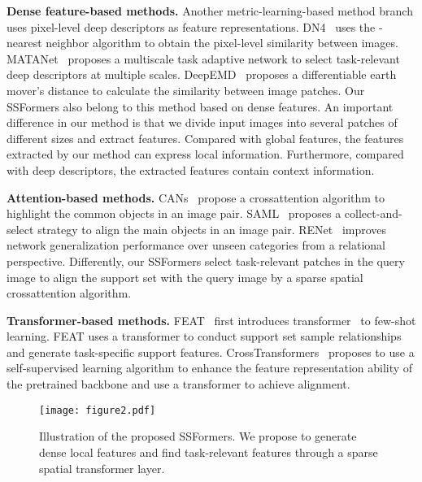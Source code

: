 \documentclass{SCIS2019}
\begin{document}
\textbf{Dense feature-based methods.} Another metric-learning-based method branch uses pixel-level deep descriptors as feature representations. DN4~\cite{9} uses the -nearest neighbor algorithm to obtain the pixel-level similarity between images. MATANet~\cite{12} proposes a multiscale task adaptive network to select task-relevant deep descriptors at multiple scales. DeepEMD~\cite{13} proposes a differentiable earth mover's distance to calculate the similarity between image patches. Our SSFormers also belong to this method based on dense features. An important difference in our method is that we divide input images into several patches of different sizes and extract features. Compared with global features, the features extracted by our method can express local information. Furthermore, compared with deep descriptors, the extracted features contain context information.

\textbf{Attention-based methods.} CANs~\cite{14} propose a crossattention algorithm to highlight the common objects in an image pair. SAML~\cite{15} proposes a collect-and-select strategy to align the main objects in an image pair. RENet~\cite{10} improves network generalization performance over unseen categories from a relational perspective. Differently, our SSFormers select task-relevant patches in the query image to align the support set with the query image by a sparse spatial crossattention algorithm.

\textbf{Transformer-based methods.} FEAT~\cite{19} first introduces transformer~\cite{20} to few-shot learning. FEAT uses a transformer to conduct support set sample relationships and generate task-specific support features. CrossTransformers~\cite{21} proposes to use a self-supervised learning algorithm to enhance the feature representation ability of the pretrained backbone and use a transformer to achieve alignment.

\begin{figure*}[t]
	\centering
	\texttt{[image: figure2.pdf]} \caption{Illustration of the proposed SSFormers. We propose to generate dense local features and find task-relevant features through a sparse spatial transformer layer.}
	\label{fig2}
\end{figure*}
\end{document}
